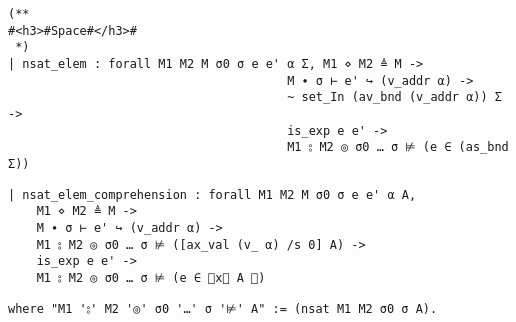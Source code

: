 \documentclass[12pt]{article}
\begin{document}
\begin{verbatim}
(**
#<h3>#Space#</h3>#
 *)
| nsat_elem : forall M1 M2 M σ0 σ e e' α Σ, M1 ⋄ M2 ≜ M ->
                                       M ∙ σ ⊢ e' ↪ (v_addr α) ->
                                       ~ set_In (av_bnd (v_addr α)) Σ ->
                                       is_exp e e' ->
                                       M1 ⦂ M2 ◎ σ0 … σ ⊭ (e ∈ (as_bnd Σ))
\end{verbatim}
\begin{verbatim}
| nsat_elem_comprehension : forall M1 M2 M σ0 σ e e' α A,
    M1 ⋄ M2 ≜ M ->
    M ∙ σ ⊢ e' ↪ (v_addr α) ->
    M1 ⦂ M2 ◎ σ0 … σ ⊭ ([ax_val (v_ α) /s 0] A) ->
    is_exp e e' ->
    M1 ⦂ M2 ◎ σ0 … σ ⊭ (e ∈ ⦃x⃒ A ⦄)
\end{verbatim}
\begin{verbatim}
where "M1 '⦂' M2 '◎' σ0 '…' σ '⊭' A" := (nsat M1 M2 σ0 σ A).
\end{verbatim}




\end{document}
